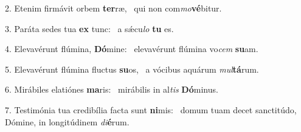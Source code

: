 2. Etenim firmávit orbem \textbf{ter}ræ, \ast\  qui non com\textit{mo}\textbf{vé}bitur.\

3. Paráta sedes tua \textbf{ex} tunc: \ast\  a sǽcu\textit{lo} \textbf{tu} es.\

4. Elevavérunt flúmina, \textbf{Dó}mine: \ast\  elevavérunt flúmina vo\textit{cem} \textbf{su}am.\

5. Elevavérunt flúmina fluctus \textbf{su}os, \ast\  a vócibus aquárum \textit{mul}\textbf{tá}rum.\

6. Mirábiles elatiónes \textbf{ma}ris: \ast\  mirábilis in al\textit{tis} \textbf{Dó}minus.\

7. Testimónia tua credibília facta sunt \textbf{ni}mis: \ast\  domum tuam decet sanctitúdo, Dómine, in longitúdinem \textit{di}\textbf{é}rum.\

